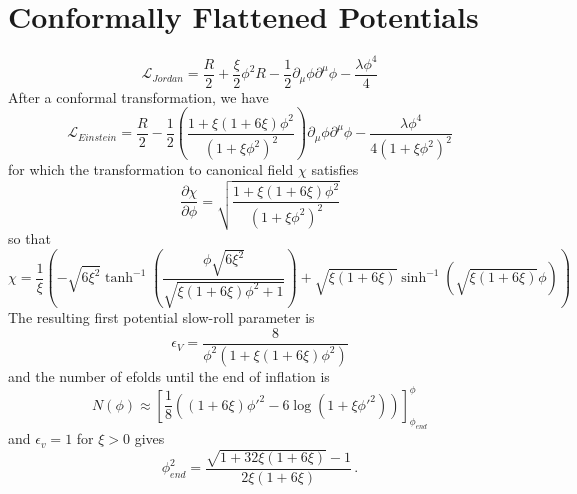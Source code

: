 \documentclass{article}
\begin{document}
\section{Conformally Flattened Potentials}
\begin{equation}
  \mathcal{L}_{Jordan} = \frac{R}{2} + \frac{\xi}{2}\phi^2R - \frac{1}{2}\partial_\mu\phi\partial^\mu\phi - \frac{\lambda\phi^4}{4}
\end{equation}
After a conformal transformation, we have
\begin{equation}
  \mathcal{L}_{Einstein} = \frac{R}{2} - \frac{1}{2}\left(\frac{1+\xi(1+6\xi)\phi^2}{(1+\xi\phi^2)^2}\right) \partial_\mu\phi\partial^\mu\phi - \frac{\lambda \phi^4}{4(1+\xi\phi^2)^2}
\end{equation}
for which the transformation to canonical field $\chi$ satisfies
\begin{equation}
  \frac{\partial \chi}{\partial \phi} = \sqrt{\frac{1+\xi(1+6\xi)\phi^2}{(1+\xi\phi^2)^2}}
\end{equation}
so that
\begin{equation}
  \chi = \frac{1}{\xi}\left(-\sqrt{6\xi^2}\tanh^{-1}\left(\frac{\phi\sqrt{6\xi^2}}{\sqrt{\xi(1+6\xi)\phi^2+1}} \right) + \sqrt{\xi(1+6\xi)}\sinh^{-1}\left(\sqrt{\xi(1+6\xi)}\phi\right) \right)
\end{equation}
The resulting first potential slow-roll parameter is
\begin{equation}
  \epsilon_V = \frac{8}{\phi^2(1+\xi(1+6\xi)\phi^2)}
\end{equation}
and the number of efolds until the end of inflation is
\begin{equation}
  N(\phi) \approx \left[\frac{1}{8}\left( (1+6\xi)\phi'^2 - 6\log(1+\xi\phi'^2) \right)\right]_{\phi_{end}}^{\phi}
\end{equation}
and $\epsilon_v=1$ for $\xi > 0$ gives
\begin{equation}
  \phi_{end}^2 = \frac{\sqrt{1+32\xi(1+6\xi)} - 1}{2\xi(1+6\xi)} \, .
\end{equation}
\end{document}
